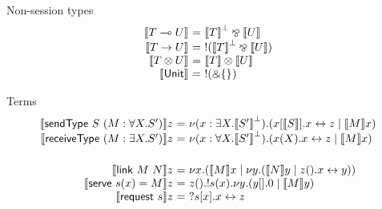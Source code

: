 \documentclass{easychair}
\makeatletter
\newcommand{\ba}{\begin{array}}
\newcommand{\ea}{\end{array}}
\newenvironment{equations}{\[\ba{@{}r@{~}c@{~}l@{}}}{\ea\]}
\newcommand{\key}{\mathsf}
\newcommand{\set}[1]{\{ #1 \}}
\newcommand{\gvtocp}[1]{\llbracket{#1}\rrbracket}
\newcommand{\row}[2]{\set{#1}_{#2}}
\newcommand{\lolli}{\multimap}
\newcommand{\gvLinFun}[2]{{#1} \lolli {#2}}
\newcommand{\gvUnFun}[2]{{#1} \to {#2}}
\newcommand{\gvTimes}[2]{{#1} \otimes {#2}}
\newcommand{\gvUnitType}{\key{Unit}}
\newcommand{\gvLink}[2]{\key{link}~{#1}~{#2}}
\newcommand{\gvSendType}[2]{\key{sendType}~{#1}~{#2}}
\newcommand{\gvReceiveType}[1]{\key{receiveType}~{#1}}
\newcommand{\gvServeOld}[3]{\key{serve}~{#1}({#2})={#3}}
\newcommand{\gvRequest}[1]{\key{request}~{#1}}
\newcommand{\cpLink}[2]{{#1} \leftrightarrow {#2}}
\newcommand{\cpCut}[3]{\nu {#1}.({#2} \mid {#3})}
\newcommand{\cpServe}[3]{!{#1}({#2}).{#3}}
\newcommand{\cpRequest}[3]{?{#1}[{#2}].{#3}}
\newcommand{\cpEmptyOut}[1]{{#1}[].0}
\newcommand{\cpEmptyIn}[2]{{#1}().{#2}}
\newcommand{\cpSendType}[3]{{#1}[{#2}].{#3}}
\newcommand{\cpReceiveType}[3]{{#1}({#2}).{#3}}
\newcommand{\cpTimes}[2]{{#1} \otimes {#2}}
\newcommand{\cpPar}[2]{{#1} \mathbin{\bindnasrepma} {#2}}
\newcommand{\cpWith}[2]{\binampersand \row{#1}{#2}}
\newcommand{\cpOfCourse}[1]{!{#1}}
\newcommand{\cpDual}[1]{{#1}^\bot}
\newcommand{\cpExists}[2]{\exists {#1}.{#2}}
\newcommand{\cpForall}[2]{\forall {#1}.{#2}}
\makeatother
\begin{document}
Non-session types
\begin{equations}
\gvtocp{\gvLinFun{T}{U}} &=& \cpPar{\cpDual{\gvtocp{T}}}{\gvtocp{U}} \\
\gvtocp{\gvUnFun{T}{U}} &=& \cpOfCourse{(\cpPar{\cpDual{\gvtocp{T}}}{\gvtocp{U}})} \\
\gvtocp{\gvTimes{T}{U}} &=& \cpTimes{\gvtocp{T}}{\gvtocp{U}} \\
\gvtocp{\gvUnitType} &=& \cpOfCourse{(\cpWith{}{})} \\
\end{equations}

Terms
\begin{equations}
\gvtocp{\gvSendType{S}{(M : \cpForall{X}{S'})}}z &=&
  \cpCut{(x:\cpExists{X}{\cpDual{\gvtocp{S'}}})}{\cpSendType{x}{\gvtocp{S}}{\cpLink{x}{z}}}{\gvtocp{M}x} \\
\gvtocp{\gvReceiveType{(M : \cpExists{X}{S'})}}z &=&
  \cpCut{(x:\cpForall{X}{\cpDual{\gvtocp{S'}}})}{\cpReceiveType{x}{X}{\cpLink{x}{z}}}{\gvtocp{M}x} \\
\\[1ex]
\gvtocp{\gvLink{M}{N}}z &=& \cpCut{x}{\gvtocp{M}x}{\cpCut{y}{\gvtocp{N}y}{\cpEmptyIn{z}{\cpLink{x}{y}}}} \\
\gvtocp{\gvServeOld{s}{x}{M}}z &=&
  \cpEmptyIn{z}
            {\cpServe{s}{x}
                     {\cpCut{y}{\cpEmptyOut{y}}{\gvtocp{M}y}}} \\
\gvtocp{\gvRequest{s}}z &=& \cpRequest{s}{x}{\cpLink{x}{z}} \\
\end{equations}
\end{document}
